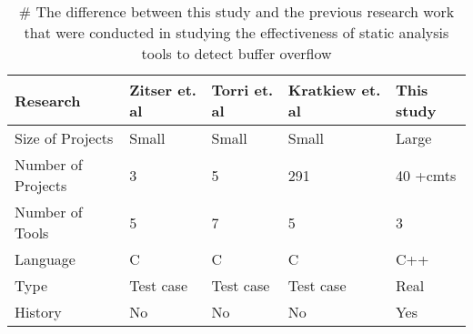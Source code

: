 \begin{table} [h!]
\centering
\scriptsize
\caption{\# The difference between this study and the previous research work that were conducted in studying the effectiveness of static analysis tools to detect buffer overflow}
\label{RealtedWork}
\scriptsize
\centering
\begin{tabular}{||p{2cm} |p{1cm} p{1cm} p{1cm} p{1cm}||}

\hline
\textbf{Research} &  \textbf{Zitser et. al}  \cite{Zitser2004}  & \textbf{Torri et. al} \cite{Torri2010} & \textbf{Kratkiew et. al} \cite{Kratkiewicz2005}&
\textbf{This study} \\  [0.5ex]
\hline\hline
Size of Projects & Small & Small & Small &  Large 
\\  
Number of Projects & 3&5&291& 40  +cmts 
\\ 
 Number of Tools & 5 & 7&5 &3
\\  
Language & C &C&C&C++
\\  
Type &  Test case & Test case & Test case & Real
\\  

History & No& No& No & Yes
\\ \hline

\end{tabular}	
\end{table}

